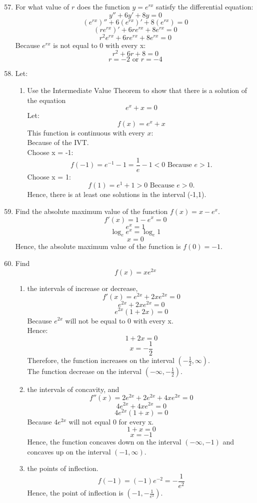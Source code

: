\documentclass[12pt]{article}
\begin{document}
\begin{enumerate}
\setcounter{enumi}{56}
        \item For what value of $r$ does the function $y = e^{rx}$ satisfy the differential equation:
        \[y'' + 6y' + 8y  = 0\]
        \[(e^{rx})'' + 6(e^{rx})' + 8(e^{rx}) = 0\]
        \[(re^{rx})' + 6re^{rx} + 8e^{rx} = 0\]
        \[r^2e^{rx} + 6re^{rx} + 8e^{rx} = 0\]
        Because $e^{rx}$ is not equal to 0 with every x:
        \[r^2 + 6r + 8 = 0\]
        \[r = -2 \text{ or } r = -4\]

\setcounter{enumi}{60}
        \item Let:
        \begin{enumerate}
            \item Use the Intermediate Value Theorem to show that there is a solution of the equation
            \[e^x + x = 0\]
            Let:
            \[f(x) = e^x + x\]
            This function is continuous with every $x$:\\
            Because of the IVT.\\
            Choose x = -1:
            \[f(-1) = e^{-1} - 1 = \frac{1}{e} - 1 < 0 \text{ Because $e > 1$.}\]
            Choose x = 1:
            \[f(1) = e^1 + 1 > 0 \text{ Because $e > 0$.}\]
            Hence, there is at least one solutions in the interval (-1,1).
        \end{enumerate}

\setcounter{enumi}{68}
        \item Find the absolute maximum value of the function $f(x) = x - e^x$.
        \[f'(x) = 1 - e^x = 0\]
        \[e^x = 1\]
        \[\log_e e^x = \log_e 1\]
        \[x = 0\]
        Hence, the absolute maximum value of the function is $f(0) = -1$.

\setcounter{enumi}{70}
        \item Find
        \[f(x) = xe^{2x}\]
        \begin{enumerate}
            \item the intervals of increase or decrease,
            \[f'(x) = e^{2x} + 2xe^{2x} = 0\]
            \[e^{2x} + 2xe^{2x} = 0\]
            \[e^{2x}(1 + 2x) = 0\]
            Because $e^{2x}$ will not be equal to 0 with every x.\\
            Hence:
            \[1 + 2x = 0\]
            \[x = -\frac{1}{2}\]
            Therefore, the function increases on the interval $(-\frac{1}{2}, \infty)$.\\
            The function decrease on the interval $(-\infty, -\frac{1}{2})$.
            \item the intervals of concavity, and
            \[f''(x) = 2e^{2x} + 2e^{2x} + 4xe^{2x} = 0\]
            \[4e^{2x} + 4xe^{2x} = 0\]
            \[4e^{2x}(1 + x) = 0\]
            Because $4e^{2x}$ will not equal 0 for every x.
            \[1 + x = 0\]
            \[x = -1\]
            Hence, the function concaves down on the interval $(-\infty, -1)$ and concaves up on the interval $(-1,\infty)$.
            \item the points of inflection.
            \[f(-1) = (-1)e^{-2} = -\frac{1}{e^2}\]
            Hence, the point of inflection is $(-1, -\frac{1}{e^2})$.
        \end{enumerate}


\end{enumerate}
\end{document}
